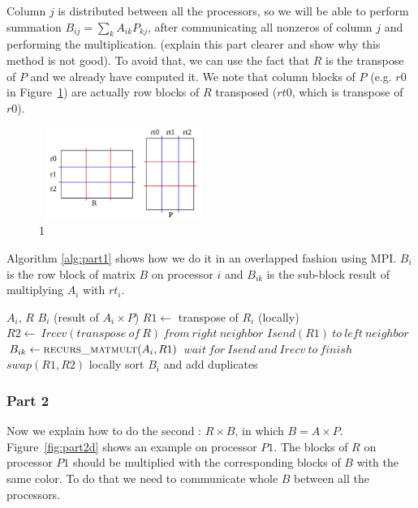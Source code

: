 Column $j$ is distributed between all the processors, so we will be able to perform  summation $B_{ij} = \sum_{k} A_{ik} P_{kj}$, after communicating all nonzeros of column $j$ and performing the multiplication. (explain this part clearer and show why this method is not good). To avoid that, we can use the fact that $R$ is the transpose of $P$ and we already have computed it. We note that column blocks of $P$ (e.g. $r0$ in Figure~\ref{fig:part1c}) are actually row blocks of $R$ transposed ($rt0$, which is transpose of $r0$).

\begin{figure}[tbh]
 \centering
 \includegraphics[width=5.5cm,height=3cm]{./figures/part1c.pdf}
 \caption{1}
 \label{fig:part1c}
\end{figure}

Algorithm \ref{alg:part1} shows how we do it in an overlapped fashion using MPI. $B_{i}$ is the row block of matrix $B$ on processor $i$ and $B_{ik}$ is the sub-block result of multiplying $A_i$ with $rt_i$.

\begin{algorithm}[H] 
  \caption{Part 1: $B_i = A_i \times P$} \label{alg:part1} 
  \begin{algorithmic}[1]
    \Require $A_i$, $R$
    \Ensure  $B_i$ (result of $A_i \times P$)
    \State $R1 \leftarrow$ transpose of $R_i$ (locally)
      \State $R2 \leftarrow\ Irecv(transpose\ of\ R)\ from\ right\ neighbor$
      \State $Isend(R1)\ to\ left\ neighbor$
      \State $B_{ik} \leftarrow \textsc{recurs\_matmult}(A_i, R1)$ 
      \State $wait\ for\ Isend\ and\ Irecv\ to\ finish$
      \State $swap(R1,R2)$
    \EndFor
    \State locally sort $B_i$ and add duplicates
  \end{algorithmic}
\end{algorithm}


\subsubsection{Part 2}

Now we explain how to do the second \mm: $R \times B$, in which $B = A \times P$. Figure~\ref{fig:part2d} shows an example on processor $P1$. The blocks of $R$ on processor $P1$ should be multiplied with the corresponding blocks of $B$ with the same color. To do that we need to communicate whole $B$ between all the processors.

